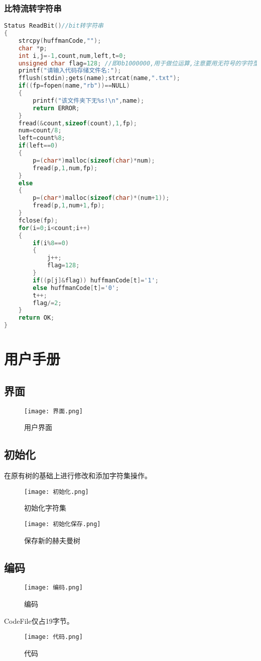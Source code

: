\documentclass{DateStructure}
\begin{document}
\subsubsection{比特流转字符串}
\begin{lstlisting}[language=c,caption={ReadBit}]
Status ReadBit()//bit转字符串
{
    strcpy(huffmanCode,"");
    char *p;
    int i,j=-1,count,num,left,t=0;
    unsigned char flag=128; //即0b1000000,用于做位运算,注意要用无符号的字符型
    printf("请输入代码存储文件名:");
    fflush(stdin);gets(name);strcat(name,".txt");
    if((fp=fopen(name,"rb"))==NULL)
    {
        printf("该文件夹下无%s!\n",name);
        return ERROR;
    }
    fread(&count,sizeof(count),1,fp);
    num=count/8;
    left=count%8;
    if(left==0)
    {
        p=(char*)malloc(sizeof(char)*num);
        fread(p,1,num,fp);
    }
    else
    {
        p=(char*)malloc(sizeof(char)*(num+1));
        fread(p,1,num+1,fp);
    }
    fclose(fp);
    for(i=0;i<count;i++)
    {
        if(i%8==0)
        {
            j++;
            flag=128;
        }
        if((p[j]&flag)) huffmanCode[t]='1';
        else huffmanCode[t]='0';
        t++;
        flag/=2;
    }
    return OK;
}
\end{lstlisting}

\section{用户手册}
\subsection{界面}
\begin{figure}[H] 
\centering
\texttt{[image: 界面.png]}
\caption{用户界面}
\end{figure}

\subsection{初始化}
在原有树的基础上进行修改和添加字符集操作。
\begin{figure}[H] 
\centering
\texttt{[image: 初始化.png]}
\caption{初始化字符集}	
\end{figure}
\begin{figure}[H] 
\centering
\texttt{[image: 初始化保存.png]}
\caption{保存新的赫夫曼树}	
\end{figure}

\subsection{编码}
\begin{figure}[H] 
\centering
\texttt{[image: 编码.png]}
\caption{编码}	
\end{figure}

CodeFile仅占19字节。
\begin{figure}[H] 
\centering
\texttt{[image: 代码.png]}
\caption{代码}	
\end{figure}
\end{document}
